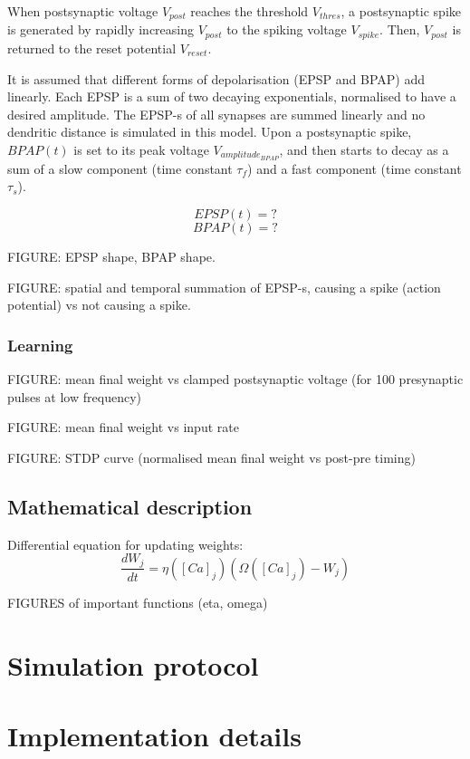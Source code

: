 \documentclass[a4paper,12pt]{report}
\theoremstyle{definition}
\begin{document}
When postsynaptic voltage $V_{post}$ reaches the threshold $V_{thres}$, a postsynaptic spike is generated by rapidly increasing $V_{post}$ to the spiking voltage $V_{spike}$. Then, $V_{post}$ is returned to the reset potential $V_{reset}$.

It is assumed that different forms of depolarisation (EPSP and BPAP) add linearly. 
Each EPSP is a sum of two decaying exponentials, normalised to have a desired amplitude. The EPSP-s of all synapses are summed linearly and no dendritic distance is simulated in this model. Upon a postsynaptic spike, $BPAP(t)$ is set to its peak voltage $V_{amplitude_{BPAP}}$, and then starts to decay as a sum of a slow component (time constant $\tau_f$) and a fast component (time constant $\tau_s$).

$$ EPSP(t) = ? $$
$$ BPAP(t) = ? $$


FIGURE: EPSP shape, BPAP shape.

FIGURE: spatial and temporal summation of EPSP-s, causing a spike (action potential) vs not causing a spike.



\subsubsection{Learning}

FIGURE: mean final weight vs clamped postsynaptic voltage (for 100 presynaptic pulses at low frequency)

FIGURE: mean final weight vs input rate

FIGURE: STDP curve (normalised mean final weight vs post-pre timing)


\subsection{Mathematical description}

Differential equation for updating weights: $$ \frac{dW_j}{dt} = \eta ([Ca]_j) (\Omega([Ca]_j) - W_j)$$

FIGURES of important functions (eta, omega)


\section{Simulation protocol}




\section{Implementation details}
\end{document}

